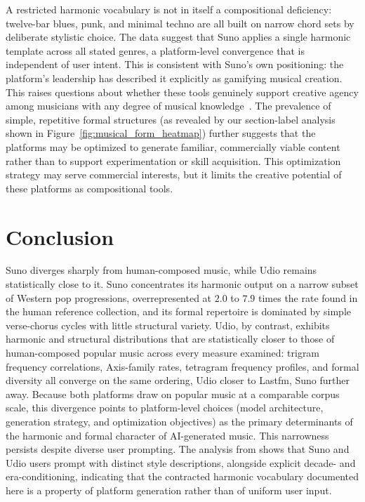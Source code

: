 \documentclass{article}
\begin{document}
A restricted harmonic vocabulary is not in itself a compositional deficiency: twelve-bar blues, punk, and minimal techno are all built on narrow chord sets by deliberate stylistic choice. The data suggest that Suno applies a single harmonic template across all stated genres, a platform-level convergence that is independent of user intent. This is consistent with Suno's own positioning: the platform's leadership has described it explicitly as gamifying musical creation. This raises questions about whether these tools genuinely support creative agency among musicians with any degree of musical knowledge~\citep{wiggins2007compositional, wiggins2016musical, lin2023promptsexploringdesignspace, tan2024we}. The prevalence of simple, repetitive formal structures (as revealed by our section-label analysis shown in Figure~\ref{fig:musical_form_heatmap}) further suggests that the platforms may be optimized to generate familiar, commercially viable content rather than to support experimentation or skill acquisition. This optimization strategy may serve commercial interests, but it limits the creative potential of these platforms as compositional tools.

\section{Conclusion}
\label{sec:conclusion}

Suno diverges sharply from human-composed music, while Udio remains statistically close to it. Suno concentrates its harmonic output on a narrow subset of Western pop progressions, overrepresented at $2.0$ to $7.9$ times the rate found in the human reference collection, and its formal repertoire is dominated by simple verse-chorus cycles with little structural variety. Udio, by contrast, exhibits harmonic and structural distributions that are statistically closer to those of human-composed popular music across every measure examined: trigram frequency correlations, Axis-family rates, tetragram frequency profiles, and formal diversity all converge on the same ordering, Udio closer to Lastfm, Suno further away. Because both platforms draw on popular music at a comparable corpus scale, this divergence points to platform-level choices (model architecture, generation strategy, and optimization objectives) as the primary determinants of the harmonic and formal character of AI-generated music. This narrowness persists despite diverse user prompting. The analysis from \citet{casini2025data} shows that Suno and Udio users prompt with distinct style descriptions, alongside explicit decade- and era-conditioning, indicating that the contracted harmonic vocabulary documented here is a property of platform generation rather than of uniform user input.
\end{document}
